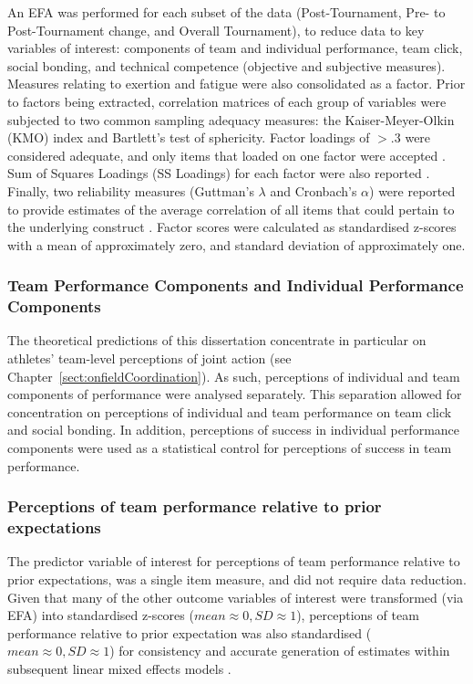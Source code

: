 \begin{CJK}{UTF8}{gbsn}
An EFA was performed for each subset of the data (Post-Tournament, Pre- to Post-Tournament change, and Overall Tournament), to reduce data to key variables of interest: components of team and individual performance, team click, social bonding, and technical competence (objective and subjective measures).  Measures relating to exertion and fatigue were also consolidated as a factor.  Prior to factors being extracted, correlation matrices of each group of variables were subjected to two common sampling adequacy measures: the Kaiser-Meyer-Olkin (KMO) index and Bartlett's test of sphericity.  Factor loadings of $> .3$ were considered adequate, and only items that loaded on one factor were accepted \citep{Field2012}.  Sum of Squares Loadings (SS Loadings) for each factor were also reported \citep{Dziuban1974}.  Finally, two reliability measures (Guttman's $\lambda$ and Cronbach's $\alpha$) were reported to provide estimates of the average correlation of all items that could pertain to the underlying construct \citep[values  $> .5$ were considered acceptable; see][]{Benton2015,Tabachnick2007}.  Factor scores were calculated as standardised z-scores with a mean of approximately zero, and standard deviation of approximately one.

\subsubsection{Team Performance Components and Individual Performance Components}
The theoretical predictions of this dissertation concentrate in particular on athletes' team-level perceptions of joint action (see Chapter~\ref{sect:onfieldCoordination}).  As such, perceptions of individual and team components of performance were analysed separately.  This separation allowed for concentration on perceptions of individual and team performance on team click and social bonding. In addition, perceptions of success in individual performance components were used as a statistical control for perceptions of success in team performance.


\subsubsection{Perceptions of team performance relative to prior expectations}
The predictor variable of interest for  perceptions of team performance relative to prior expectations, was a single item measure, and did not require data reduction.  Given that many of the other outcome variables of interest were transformed (via EFA) into standardised z-scores ($mean \approx 0, SD \approx 1$), perceptions of team performance relative to prior expectation was also standardised ($mean \approx 0, SD \approx 1$) for consistency and accurate generation of estimates within subsequent linear mixed effects models \citep{Bates2015}.


\end{CJK}
